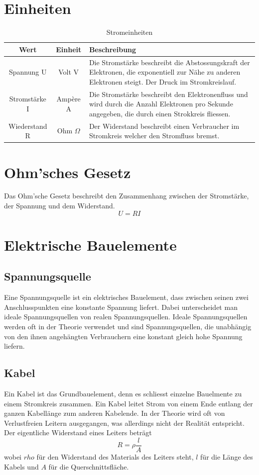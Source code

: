 \documentclass{article}
\author{Philipp Kiss}
\begin{document}

\section{Einheiten}
\begin{table}[h!]
		\begin{center}
				\caption{Stromeinheiten}
				\label{tab:Stromeinheiten}
				\begin{tabular}{|c|c|p{7cm}|}
						\hline
						\textbf{Wert} & \textbf{Einheit} & \textbf{Beschreibung} \\
						\hline
						Spannung U & Volt V & Die Stromstärke beschreibt die Abstossungskraft der Elektronen, die exponentiell zur Nähe zu anderen Elektronen steigt. Der Druck im Stromkreislauf.\\
						\hline
						Stromstärke I & Ampère A& Die Stromstärke beschreibt den Elektronenfluss und wird durch die Anzahl Elektronen pro Sekunde angegeben, die durch einen Strokkreis fliessen.\\
						\hline
						Wiederstand R & Ohm \(\Omega\) & Der Widerstand beschreibt einen Verbraucher im Stromkreis welcher den Stromfluss bremst.\\
						\hline
				\end{tabular}
		\end{center}
\end{table}
\section{Ohm'sches Gesetz}
Das Ohm'sche Gesetz beschreibt den Zusammenhang zwischen der Stromstärke, der Spannung und dem Widerstand. \[
U=RI
\]
\section{Elektrische Bauelemente}
\subsection{Spannungsquelle}
Eine Spannungsquelle ist ein elektrisches Bauelement, dass zwischen seinen zwei Anschlusspunkten eine konstante Spannung liefert. Dabei unterscheidet man ideale Spannungsquellen von realen Spannungsquellen. Ideale Spannungsquellen werden oft in der Theorie verwendet und sind Spannungsquellen, die unabhängig von den ihnen angehängten Verbrauchern eine konstant gleich hohe Spannung liefern.

\subsection{Kabel}
Ein Kabel ist das Grundbauelement, denn es schliesst einzelne Bauelmente zu einem Stromkreis zusammen. Ein Kabel leitet Strom von einem Ende entlang der ganzen Kabellänge zum anderen Kabelende. In der Theorie wird oft von Verlustfreien Leitern ausgegangen, was allerdings nicht der Realität entspricht. Der eigentliche Widerstand eines Leiters beträgt \[
R = \rho \frac{l}{A} 
\] wobei \(rho\) für den Widerstand des Materials des Leiters steht, \(l\) für die Länge des Kabels und \(A\) für die Querschnittsfläche.
\end{document}
